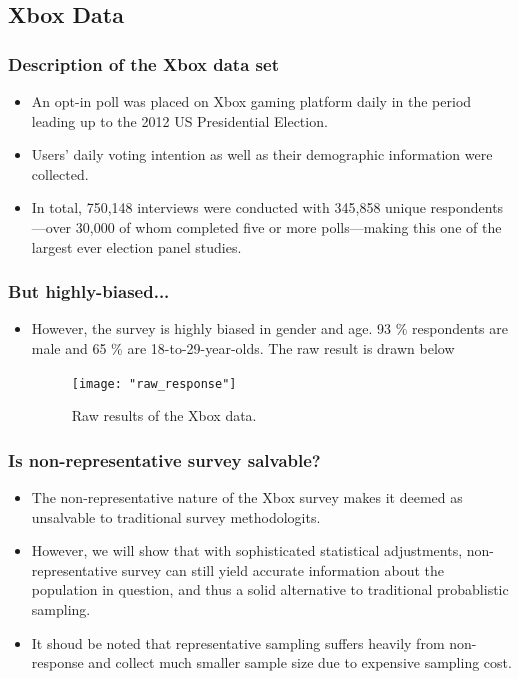 \documentclass[xetex,mathserif,serif]{beamer}
\begin{document}
\subsection{Xbox Data}
\begin{frame}
  \frametitle{Description of the Xbox data set}
  \begin{itemize}
  \item An opt-in poll was placed on Xbox gaming platform daily in the period
    leading up to the 2012 US Presidential Election. 
  \item Users' daily voting intention as well as their demographic information
    were collected.
  \item In total, 750,148 interviews were conducted with 345,858 unique
    respondents—over 30,000 of whom completed five or more polls—making this one
    of the largest ever election panel studies.
  \end{itemize}
\end{frame}

\begin{frame}
  \frametitle{But highly-biased...}
  \begin{itemize}
  \item However, the survey is highly biased in gender and age. 93 \% respondents
    are male and 65 \% are 18-to-29-year-olds. The raw result is drawn below
    \begin{figure}[htbp]
      \centering
      \texttt{[image: "raw\_response"]}
      \caption{Raw results of the Xbox data.}
      \label{fig:raw}
    \end{figure}
  \end{itemize}
\end{frame}

\begin{frame}
  \frametitle{Is non-representative survey salvable?}
  \begin{itemize}
  \item The non-representative nature of the Xbox survey makes it deemed as
    unsalvable to traditional survey methodologits.
  \item However, we will show that with sophisticated statistical adjustments,
    non-representative survey can still yield accurate information about the
    population in question, and thus a solid alternative to traditional
    probablistic sampling.
  \item It shoud be noted that representative sampling suffers heavily from
    non-response and collect much smaller sample size due to expensive sampling
    cost.
  \end{itemize}
\end{frame}
\end{document}
